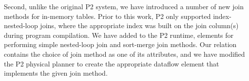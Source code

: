 Second, unlike the original P2 system, we have introduced a number of new join
methods for in-memory tables.  Prior to this work, P2 only supported
index-nested-loop joins, where the appropriate index was built on the join
column(s) during program compilation.  We have added to the P2 runtime, elements
for performing simple nested-loop join and sort-merge join methods.  Our
 relation contains the choice of join method as one of its
attributes, and we have modified the P2 physical planner to create the
appropriate dataflow element that implements the given join method.



